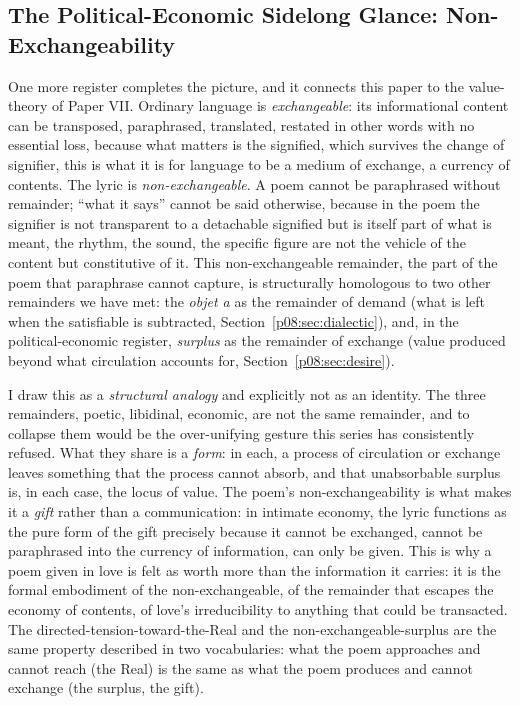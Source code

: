 \subsection{The Political-Economic Sidelong Glance: Non-Exchangeability}

One more register completes the picture, and it connects this paper to the value-theory of Paper VII. Ordinary language is \emph{exchangeable}: its informational content can be transposed, paraphrased, translated, restated in other words with no essential loss, because what matters is the signified, which survives the change of signifier, this is what it is for language to be a medium of exchange, a currency of contents. The lyric is \emph{non-exchangeable}. A poem cannot be paraphrased without remainder; ``what it says'' cannot be said otherwise, because in the poem the signifier is not transparent to a detachable signified but is itself part of what is meant, the rhythm, the sound, the specific figure are not the vehicle of the content but constitutive of it. This non-exchangeable remainder, the part of the poem that paraphrase cannot capture, is structurally homologous to two other remainders we have met: the \textit{objet a} as the remainder of demand (what is left when the satisfiable is subtracted, Section~\ref{p08:sec:dialectic}), and, in the political-economic register, \emph{surplus} as the remainder of exchange (value produced beyond what circulation accounts for, Section~\ref{p08:sec:desire}).

I draw this as a \emph{structural analogy} and explicitly not as an identity. The three remainders, poetic, libidinal, economic, are not the same remainder, and to collapse them would be the over-unifying gesture this series has consistently refused. What they share is a \emph{form}: in each, a process of circulation or exchange leaves something that the process cannot absorb, and that unabsorbable surplus is, in each case, the locus of value. The poem's non-exchangeability is what makes it a \emph{gift} rather than a communication: in intimate economy, the lyric functions as the pure form of the gift precisely because it cannot be exchanged, cannot be paraphrased into the currency of information, can only be given. This is why a poem given in love is felt as worth more than the information it carries: it is the formal embodiment of the non-exchangeable, of the remainder that escapes the economy of contents, of love's irreducibility to anything that could be transacted. The directed-tension-toward-the-Real and the non-exchangeable-surplus are the same property described in two vocabularies: what the poem approaches and cannot reach (the Real) is the same as what the poem produces and cannot exchange (the surplus, the gift).

